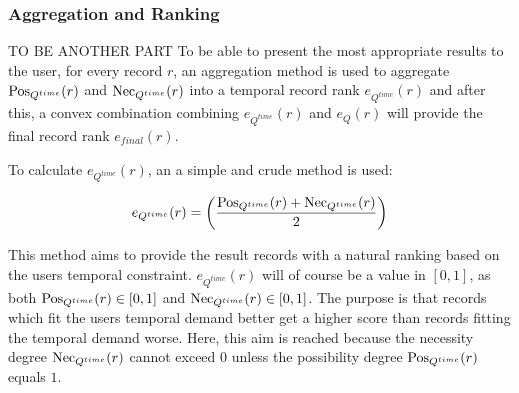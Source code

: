 \begin{table}[h]
\begin{tabular}{|c|c|c|}
\end{tabular}
%
%
%
\label{tab:fuzzy-allen-relations}
\end{table}

\subsubsection{Aggregation and Ranking} TO BE ANOTHER PART
To be able to present the most appropriate results to the user, for every record $r$, an aggregation method is used to aggregate $\operatorname{Pos}_{Q^{time}}(r)$ and $\operatorname{Nec}_{Q^{time}}(r)$ into a temporal record rank $e_{Q^{time}}(r)$ and after this, a convex combination combining $e_{Q^{time}}(r)$ and $e_{Q}(r)$ will provide the final record rank $e_{final}(r)$.


To calculate $e_{Q^{time}}(r)$, an a simple and crude method is used:

\begin{equation}
\label{eq:temporal-eval}
e_{Q^{time}}(r) = \left(\frac{\Pos_{Q^{time}}(r)+\Nec_{Q^{time}}(r)}{2}\right)
\end{equation}

This method aims to provide the result records with a natural ranking based on the users temporal constraint. $e_{Q^{time}}(r)$ will of course be a value in $\left[0,1\right]$, as both $\operatorname{Pos}_{Q^{time}}(r) \in \left[0,1\right]$ and $\operatorname{Nec}_{Q^{time}}(r) \in \left[0,1\right]$. The purpose is that records which fit the users temporal demand better get a higher score than records fitting the temporal demand worse. Here, this aim is reached because the necessity degree $\operatorname{Nec}_{Q^{time}}(r)$ cannot exceed $0$ unless the possibility degree $\operatorname{Pos}_{Q^{time}}(r)$ equals $1$.


